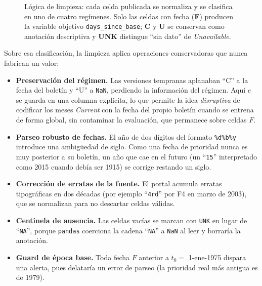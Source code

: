 \documentclass[12pt,letterpaper]{report}
\begin{document}
\begin{figure}[H]
\caption[Clasificación y conversión de cada celda]{Lógica de limpieza: cada celda publicada se
normaliza y se clasifica en uno de cuatro regímenes. Solo las celdas con fecha (\textbf{F})
producen la variable objetivo \texttt{days\_since\_base}; \textbf{C} y \textbf{U} se conservan
como anotación descriptiva y \textbf{UNK} distingue ``sin dato'' de \textit{Unavailable}.}
\label{fig:cleansing}
\end{figure}

Sobre esa clasificación, la limpieza aplica operaciones conservadoras que nunca fabrican un
valor:

\begin{itemize}[leftmargin=*]
\item \textbf{Preservación del régimen.} Las versiones tempranas aplanaban ``C'' a la fecha del
boletín y ``U'' a \texttt{NaN}, perdiendo la información del régimen. Aquí $e$ se guarda en una
columna explícita, lo que permite la idea \textit{disruptiva} de codificar los meses
\textit{Current} con la fecha del propio boletín cuando se entrena de forma global, sin
contaminar la evaluación, que permanece sobre celdas $F$.
\item \textbf{Parseo robusto de fechas.} El año de dos dígitos del formato \texttt{\%d\%b\%y}
introduce una ambigüedad de siglo. Como una fecha de prioridad nunca es muy posterior a su
boletín, un año que cae en el futuro (un ``\texttt{15}'' interpretado como 2015 cuando debía ser
1915) se corrige restando un siglo.
\item \textbf{Corrección de erratas de la fuente.} El portal acumula erratas tipográficas en dos
décadas (por ejemplo ``\texttt{4rd}'' por F4 en marzo de 2003), que se normalizan para no
descartar celdas válidas.
\item \textbf{Centinela de ausencia.} Las celdas vacías se marcan con \texttt{UNK} en lugar de
``\texttt{NA}'', porque \texttt{pandas} coerciona la cadena ``\texttt{NA}'' a \texttt{NaN} al
leer y borraría la anotación.
\item \textbf{Guard de época base.} Toda fecha $F$ anterior a $t_0=$ 1-ene-1975 dispara una
alerta, pues delataría un error de parseo (la prioridad real más antigua es de 1979).
\end{itemize}
\end{document}
